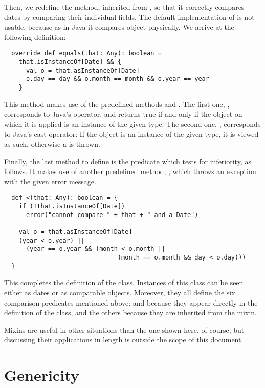 \documentclass[a4paper,12pt,twoside,titlepage]{article}
\newcommand{\langname}[1]{#1\xspace}
\newcommand{\Java}{\langname{Java}}
\begin{document}
Then, we redefine the  method, inherited from
, so that it correctly compares dates by comparing their
individual fields. The default implementation of  is not
usable, because as in \Java it compares object physically. We arrive
at the following definition:
\begin{lstlisting}
  override def equals(that: Any): boolean =
    that.isInstanceOf[Date] && {
      val o = that.asInstanceOf[Date]
      o.day == day && o.month == month && o.year == year
    }
\end{lstlisting}
This method makes use of the predefined methods 
and . The first one, ,
corresponds to \Java's  operator, and returns true
if and only if the object on which it is applied is an instance of the
given type. The second one, , corresponds to
\Java's cast operator: If the object is an instance of the given type,
it is viewed as such, otherwise a  is
thrown.

Finally, the last method to define is the predicate which tests for
inferiority, as follows. It makes use of another predefined method,
, which throws an exception with the given error message.
\begin{lstlisting}
  def <(that: Any): boolean = {
    if (!that.isInstanceOf[Date])
      error("cannot compare " + that + " and a Date")

    val o = that.asInstanceOf[Date]
    (year < o.year) ||
      (year == o.year && (month < o.month ||
                               (month == o.month && day < o.day)))
  }
\end{lstlisting}
This completes the definition of the  class. Instances of
this class can be seen either as dates or as comparable objects.
Moreover, they all define the six comparison predicates mentioned
above:  and \code{<} because they appear directly in
the definition of the  class, and the others because they
are inherited from the  mixin.

Mixins are useful in other situations than the one shown here, of
course, but discussing their applications in length is outside the
scope of this document.

\section{Genericity}
\label{sec:genericity}
\end{document}
